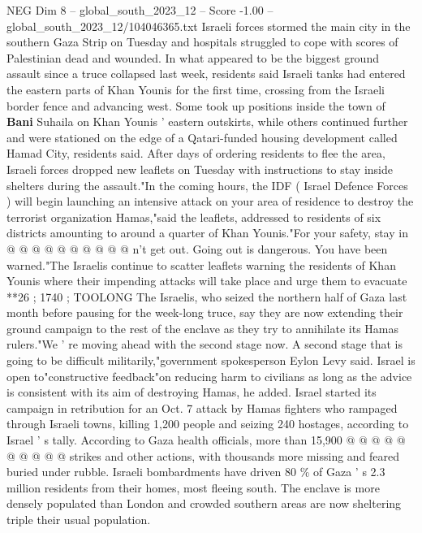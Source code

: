 \begin{textsample}{NEG Dim 8 – global\_south\_2023\_12 – Score -1.00 – global\_south\_2023\_12/104046365.txt}  \label{ex:f8_neg_226}
Israeli forces stormed the main city in the southern Gaza Strip on Tuesday and hospitals struggled to cope with scores of Palestinian dead and wounded.
In what appeared to be the biggest ground assault since a truce collapsed last week, residents said Israeli tanks had entered the eastern parts of Khan Younis for the first time, crossing from the Israeli border fence and advancing west.
Some took up positions inside the town of \textbf{Bani} Suhaila on Khan Younis ' eastern outskirts, while others continued further and were stationed on the edge of a Qatari-funded housing development called Hamad City, residents said.
After days of ordering residents to flee the area, Israeli forces dropped new leaflets on Tuesday with instructions to stay inside shelters during the assault."In the coming hours, the IDF ( Israel Defence Forces ) will begin launching an intensive attack on your area of residence to destroy the terrorist organization Hamas,"said the leaflets, addressed to residents of six districts amounting to around a quarter of Khan Younis."For your safety, stay in @ @ @ @ @ @ @ @ @ @ n't get out.
Going out is dangerous.
You have been warned."The Israelis continue to scatter leaflets warning the residents of Khan Younis where their impending attacks will take place and urge them to evacuate **26 ; 1740 ; TOOLONG The Israelis, who seized the northern half of Gaza last month before pausing for the week-long truce, say they are now extending their ground campaign to the rest of the enclave as they try to annihilate its Hamas rulers."We ' re moving ahead with the second stage now.
A second stage that is going to be difficult militarily,"government spokesperson Eylon Levy said.
Israel is open to"constructive feedback"on reducing harm to civilians as long as the advice is consistent with its aim of destroying Hamas, he added.
Israel started its campaign in retribution for an Oct. 7 attack by Hamas fighters who rampaged through Israeli towns, killing 1,200 people and seizing 240 hostages, according to Israel ' s tally.
According to Gaza health officials, more than 15,900 @ @ @ @ @ @ @ @ @ @ strikes and other actions, with thousands more missing and feared buried under rubble.
Israeli bombardments have driven 80 \% of Gaza ' s 2.3 million residents from their homes, most fleeing south.
The enclave is more densely populated than London and crowded southern areas are now sheltering triple their usual population.

\end{textsample}
